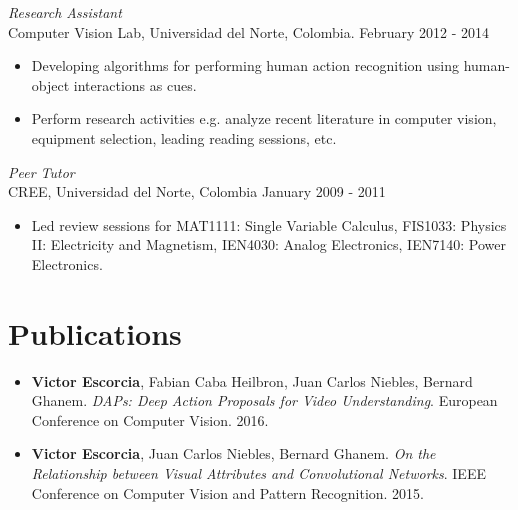 \documentclass[margin]{res}
\begin{document}
\begin{resume}
 \textit{Research Assistant}\\
 Computer Vision Lab, Universidad del Norte, Colombia. \hfill February 2012 - 2014 \\
 \begin{itemize} \itemsep -2pt %
  \item Developing algorithms for performing human action recognition using
 human-object interactions as cues.
 \item Perform research activities e.g. analyze recent literature in computer
       vision, equipment selection, leading reading sessions, etc.
 \end{itemize}
 
 \textit{Peer Tutor}\\
 CREE, Universidad del Norte, Colombia \hfill January  2009 - 2011 \\
 \begin{itemize} \itemsep -2pt %
  \item Led review sessions for MAT1111: Single Variable Calculus, FIS1033:
 Physics II: Electricity and Magnetism, IEN4030: Analog Electronics,
 IEN7140: Power Electronics.
  \end{itemize}



\section{Publications} 
\begin{itemize} \itemsep -2pt %

\item \textbf{Victor Escorcia}, Fabian Caba Heilbron, Juan Carlos Niebles, Bernard Ghanem.
\textit{DAPs: Deep Action Proposals for Video Understanding}.
European Conference on Computer Vision. 2016.
\smallskip

\item \textbf{Victor Escorcia}, Juan Carlos Niebles, Bernard Ghanem.
\textit{On the Relationship between Visual Attributes and Convolutional
Networks}.
IEEE Conference on Computer Vision and Pattern Recognition. 2015.
\smallskip


\end{itemize}
\end{resume}
\end{document}
